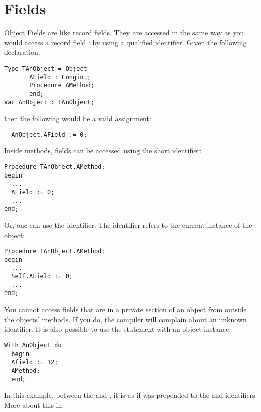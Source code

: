 \documentclass{report}
\begin{document}
\section{Fields}
Object Fields are like record fields. They are accessed in the same way as
you would access a record field : by using a qualified identifier. Given the
following declaration:
\begin{verbatim}
Type TAnObject = Object
       AField : Longint;
       Procedure AMethod;
       end;
Var AnObject : TAnObject;
\end{verbatim}
then the following would be a valid assignment:
\begin{verbatim}
  AnObject.AField := 0;
\end{verbatim}
Inside methods, fields can be accessed using the short identifier:
\begin{verbatim}
Procedure TAnObject.AMethod;
begin
  ...
  AField := 0;
  ...
end;
\end{verbatim}
Or, one can use the  identifier. The  identifier refers
to the current instance of the object:
\begin{verbatim}
Procedure TAnObject.AMethod;
begin
  ...
  Self.AField := 0;
  ...
end;
\end{verbatim}
You cannot access fields that are in a private section of an object from
outside the objects' methods. If you do, the compiler will complain about
an unknown identifier.
It is also possible to use the  statement with an object instance:
\begin{verbatim}
With AnObject do
  begin
  Afield := 12;
  AMethod;
  end;
\end{verbatim}
In this example, between the  and , it is as if
 was prepended to the  and 
identifiers. More about this in 
\end{document}
